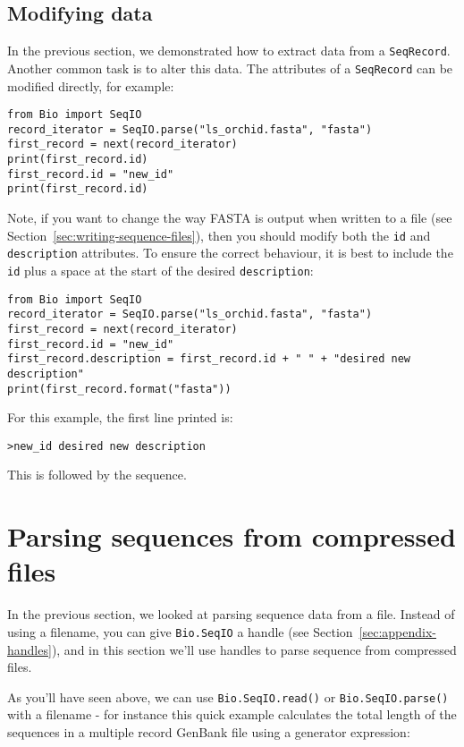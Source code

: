 \subsection{Modifying data}

In the previous section, we demonstrated how to extract data from a 
\verb|SeqRecord|. Another common task is to alter this data. The attributes 
of a \verb|SeqRecord| can be modified directly, for example:

\begin{verbatim}
from Bio import SeqIO
record_iterator = SeqIO.parse("ls_orchid.fasta", "fasta")
first_record = next(record_iterator)
print(first_record.id)
first_record.id = "new_id"
print(first_record.id)
\end{verbatim}

Note, if you want to change the way FASTA is output when written to a file 
(see Section~\ref{sec:writing-sequence-files}), then you should modify both 
the \verb|id| and \verb|description| attributes. To ensure the correct 
behaviour, it is best to include the \verb|id| plus a space at the start of 
the desired \verb|description|:

\begin{verbatim}
from Bio import SeqIO
record_iterator = SeqIO.parse("ls_orchid.fasta", "fasta")
first_record = next(record_iterator)
first_record.id = "new_id"
first_record.description = first_record.id + " " + "desired new description"
print(first_record.format("fasta"))
\end{verbatim}

For this example, the first line printed is:

\begin{verbatim}
>new_id desired new description
\end{verbatim}

This is followed by the sequence.

\section{Parsing sequences from compressed files}
\label{sec:SeqIO_compressed}
In the previous section, we looked at parsing sequence data from a file.
Instead of using a filename, you can give \verb|Bio.SeqIO| a handle
(see Section~\ref{sec:appendix-handles}), and in this section
we'll use handles to parse sequence from compressed files.

As you'll have seen above, we can use \verb|Bio.SeqIO.read()| or
\verb|Bio.SeqIO.parse()| with a filename - for instance this quick
example calculates the total length of the sequences in a multiple
record GenBank file using a generator expression:

